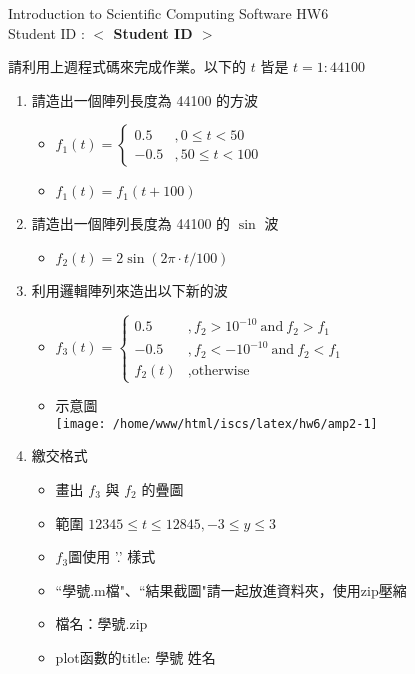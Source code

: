 \documentclass[12pt,a4paper]{article}
\newcommand{\placeholder}[1]{\textbf{$<$ #1 $>$}}
\newcommand{\idnumber}{\placeholder{Student ID}}
\begin{document}
\begin{CJK}{UTF8}{bsmi}
\begin{flushleft}Introduction to Scientific Computing Software HW6
\\Student ID : \idnumber{}\end{flushleft}

請利用上週程式碼來完成作業。以下的 $t$ 皆是 $t=1:44100$
\begin{enumerate}
\item 請造出一個陣列長度為 44100 的方波
\begin{itemize} 


\item $f_1(t)=\left\{\begin{array}{ll}0.5&,0 \le t < 50 \\ -0.5 &,50 \le t < 100\end{array}\right.$
\item $f_1(t)=f_1(t+100)$
\end{itemize}
\item 請造出一個陣列長度為 44100 的 $\sin$ 波
\begin{itemize}

\item $f_2(t)=2\sin(2\pi \cdot t/100)$
\end{itemize}

\item 利用邏輯陣列來造出以下新的波
\begin{itemize}

\item $f_3(t)=\left\{\begin{array}{ll}0.5&, f_2>10^{-10}\ \mbox{and}\ f_2>f_1 \\ -0.5 &,f_2<-10^{-10}\ \mbox{and}\ f_2<f_1 \\f_2(t) & ,\mbox{otherwise} \end{array}\right.$
\item 示意圖 \\ \texttt{[image: /home/www/html/iscs/latex/hw6/amp2-1]}
\end{itemize}
\item 繳交格式
\begin{itemize}
\item  畫出 $f_3$ 與 $f_2$ 的疊圖
\item  範圍 $12345\le t \le 12845, -3\le y \le 3$
\item  $f_3$圖使用 '.' 樣式
\item ``學號.m檔"、``結果截圖"請一起放進資料夾，使用zip壓縮
\item  檔名：學號.zip
\item  plot函數的title: 學號  姓名
\end{itemize}
\end{enumerate}
\end{CJK}
\end{document}
